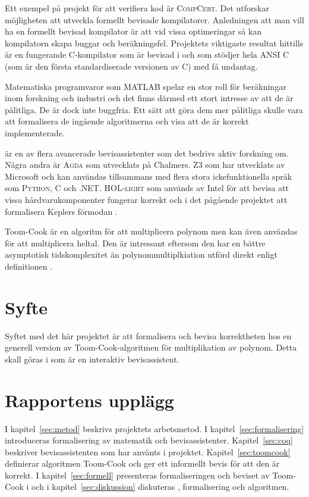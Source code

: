 Ett exempel på projekt för att verifiera kod är \textsc{CompCert}. Det
utforskar möjligheten att utveckla formellt bevisade kompilatorer. Anledningen
att man vill ha en formellt bevisad kompilator är att vid vissa optimeringar så
kan kompilatorn skapa buggar och beräkningsfel. Projektets viktigaste resultat
hittills är en fungerande C-kompilator som är bevisad i \coq{} och som stödjer
hela \textsc{ANSI C} (som är den första standardiserade versionen av
\textsc{C}) med få undantag\cite{compcert}.

Matematiska programvaror som \textsc{MATLAB} spelar en stor roll för
beräkningar inom forskning och industri och det finns därmed ett stort intresse
av att de är pålitliga. De är dock inte buggfria. Ett sätt att göra dem mer
pålitliga skulle vara att formalisera de ingående algoritmerna och visa att de
är korrekt implementerade\cite{denes2012refinement}.

\coq{} är en av flera avancerade bevisassistenter som det bedrivs aktiv
forskning om. Några andra är \textsc{Agda} som utvecklats på Chalmers.
\textsc{Z3} som har utvecklats av Microsoft och kan användas tillsammans med
flera stora ickefunktionella språk som \textsc{Python}, \textsc{C} och
\textsc{.NET}. \textsc{HOL-light} som används av Intel för att bevisa att vissa
hårdvarukomponenter fungerar korrekt och i det pågående projektet att
formalisera Keplers förmodan \cite{hales2008formal}.

Toom-Cook är en algoritm för att multiplicera polynom men kan även användas
för att multiplicera heltal. Den är intressant eftersom den har en bättre
asymptotisk tidskomplexitet än polynommultiplkiation utförd direkt enligt
definitionen .

\section{Syfte}
Syftet med det här projektet är att formalisera och bevisa korrektheten hos en
generell version av Toom-Cook-algoritmen för multiplikation av polynom. Detta
skall göras i \coq som är en interaktiv bevisassistent.

\section{Rapportens upplägg}
I kapitel~\ref{sec:metod} beskrivs projektets arbetsmetod. I
kapitel~\ref{sec:formalisering} introduceras formalisering av matematik och
bevisassistenter. Kapitel~\ref{sec:coq} beskriver bevisassistenten \coq{} som har
använts i projektet. Kapitel~\ref{sec:toomcook} definierar algoritmen Toom-Cook och
ger ett informellt bevis för att den är korrekt. I kapitel~\ref{sec:formell}
presenteras formaliseringen och beviset av Toom-Cook i \coq{} och i
kapitel~\ref{sec:diskussion} diskuteras \coq{}, formalisering och algoritmen.

